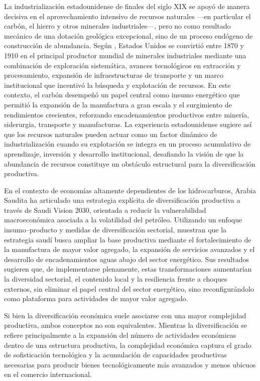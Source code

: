 \documentclass[../../TFM.tex]{subfiles}
\begin{document}
	La industrialización estadounidense de finales del siglo XIX se apoyó de manera decisiva en el aprovechamiento intensivo de recursos naturales —en particular el carbón, el hierro y otros minerales industriales—, pero no como resultado mecánico de una dotación geológica excepcional, sino de un proceso endógeno de construcción de abundancia. Según \textcite{David1997}, Estados Unidos se convirtió entre 1870 y 1910 en el principal productor mundial de minerales industriales mediante una combinación de exploración sistemática, avances tecnológicos en extracción y procesamiento, expansión de infraestructuras de transporte y un marco institucional que incentivó la búsqueda y explotación de recursos. En este contexto, el carbón desempeñó un papel central como insumo energético que permitió la expansión de la manufactura a gran escala y el surgimiento de rendimientos crecientes, reforzando encadenamientos productivos entre minería, siderurgia, transporte y manufacturas. La experiencia estadounidense sugiere así que los recursos naturales pueden actuar como un factor dinámico de industrialización cuando su explotación se integra en un proceso acumulativo de aprendizaje, inversión y desarrollo institucional, desafiando la visión de que la abundancia de recursos constituye un obstáculo estructural para la diversificación productiva.
	
	En el contexto de economías altamente dependientes de los hidrocarburos, Arabia Saudita ha articulado una estrategia explícita de diversificación productiva a través de Saudi Vision 2030, orientada a reducir la vulnerabilidad macroeconómica asociada a la volatilidad del petróleo. Utilizando un enfoque insumo--producto y medidas de diversificación sectorial, \textcite{Havrlant2021} muestran que la estrategia saudí busca ampliar la base productiva mediante el fortalecimiento de la manufactura de mayor valor agregado, la expansión de servicios avanzados y el desarrollo de encadenamientos aguas abajo del sector energético. Sus resultados sugieren que, de implementarse plenamente, estas transformaciones aumentarían la diversidad sectorial, el contenido local y la resiliencia frente a choques externos, sin eliminar el papel central del sector energético, sino reconfigurándolo como plataforma para actividades de mayor valor agregado.
	
	Si bien la diversificación económica suele asociarse con una mayor complejidad productiva, ambos conceptos no son equivalentes. Mientras la diversificación se refiere principalmente a la expansión del número de actividades económicas dentro de una estructura productiva, la complejidad económica captura el grado de sofisticación tecnológica y la acumulación de capacidades productivas necesarias para producir bienes tecnológicamente más avanzados y menos ubicuos en el comercio internacional.
	
\end{document}
